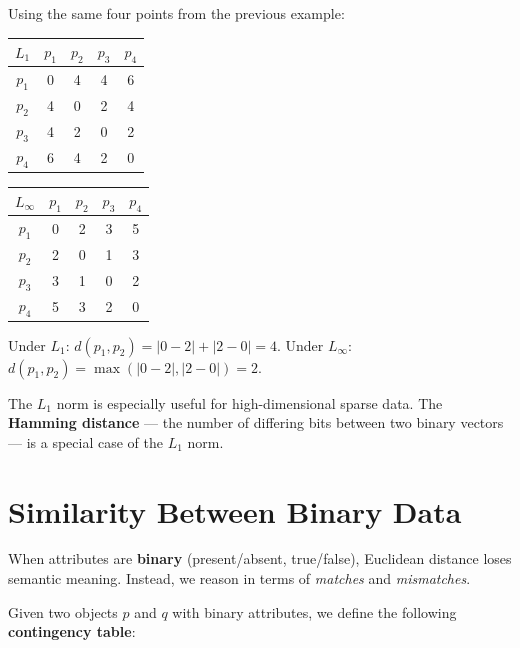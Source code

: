 \begin{example}
Using the same four points from the previous example:

\begin{center}
\small
\begin{tabular}{c | c c c c}
\toprule
$L_1$ & $p_1$ & $p_2$ & $p_3$ & $p_4$ \\
\midrule
$p_1$ & 0 & 4 & 4 & 6 \\
$p_2$ & 4 & 0 & 2 & 4 \\
$p_3$ & 4 & 2 & 0 & 2 \\
$p_4$ & 6 & 4 & 2 & 0 \\
\bottomrule
\end{tabular}
\hspace{1cm}
\begin{tabular}{c | c c c c}
\toprule
$L_\infty$ & $p_1$ & $p_2$ & $p_3$ & $p_4$ \\
\midrule
$p_1$ & 0 & 2 & 3 & 5 \\
$p_2$ & 2 & 0 & 1 & 3 \\
$p_3$ & 3 & 1 & 0 & 2 \\
$p_4$ & 5 & 3 & 2 & 0 \\
\bottomrule
\end{tabular}
\end{center}

Under $L_1$: $d(p_1, p_2) = |0-2|+|2-0| = 4$. Under $L_\infty$: $d(p_1, p_2) = \max(|0-2|, |2-0|) = 2$.
\end{example}

The $L_1$ norm is especially useful for high-dimensional sparse data. The \textbf{Hamming distance} — the number of differing bits between two binary vectors — is a special case of the $L_1$ norm.

\section{Similarity Between Binary Data}
\label{sec:binary-similarity}

When attributes are \textbf{binary} (present/absent, true/false), Euclidean distance loses semantic meaning. Instead, we reason in terms of \textit{matches} and \textit{mismatches}.

Given two objects $p$ and $q$ with binary attributes, we define the following \textbf{contingency table}:

